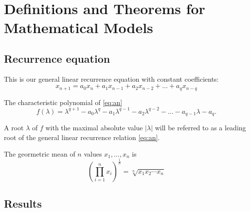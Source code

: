 \section{Definitions and Theorems for Mathematical Models}
\label{ch:theorems}

\subsection{Recurrence equation}

This is our general linear recurrence equation with constant coefficients:
\begin{equation}\label{eq:an}
    x_{n+1} = a_0x_n + a_1x_{n-1} + a_2x_{n-2} + \dots + a_{q}x_{n-q}
\end{equation}

The characteristic polynomial of \ref{eq:an}
\begin{equation}\label{eq:fchar}
    f(\lambda) = \lambda^{q+1} - a_0\lambda^q - a_1\lambda^{q-1} - a_2\lambda^{q-2} - \dots - a_{q-1}\lambda - a_q.
\end{equation}

\begin{definition}
A root $\lambda$ of $f$ with the maximal absolute value $|\lambda|$ will be referred to as a leading root of the general linear recurrence relation \ref{eq:an}.
\end{definition}

\begin{definition}
The geormetric mean of $n$ values $x_1,\dots,x_n$ is
\begin{equation}\label{eq:geometricmean}
   \left(\prod\limits_{i=1}^n x_i \right)^{\frac1n} = \sqrt[n]{x_1 x_2 \cdots x_n}
\end{equation}
\end{definition}

\subsection{Results}

